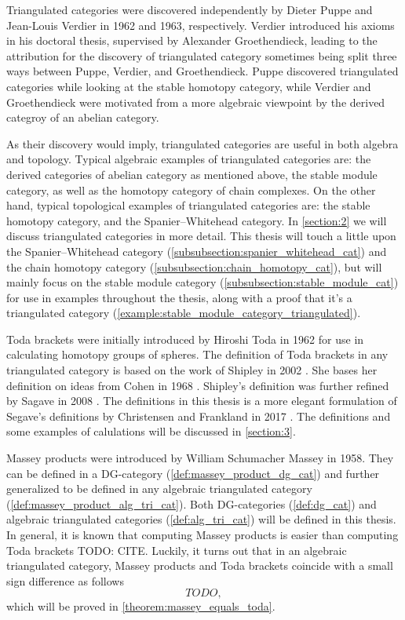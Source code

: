 Triangulated categories were discovered independently by Dieter Puppe and Jean-Louis Verdier in 1962 and 1963, respectively. Verdier introduced his axioms in his doctoral thesis, supervised by Alexander Groethendieck, leading to the attribution for the discovery of triangulated category sometimes being split three ways between Puppe, Verdier, and Groethendieck. Puppe discovered triangulated categories while looking at the stable homotopy category, while Verdier and Groethendieck were motivated from a more algebraic viewpoint by the derived categroy of an abelian category.

As their discovery would imply, triangulated categories are useful in both algebra and topology. Typical algebraic examples of triangulated categories are: the derived categories of abelian category as mentioned above, the stable module category, as well as the homotopy category of chain complexes. On the other hand, typical topological examples of triangulated categories are: the stable homotopy category, and the Spanier--Whitehead category. In \autoref{section:2} we will discuss triangulated categories in more detail. This thesis will touch a little upon the Spanier--Whitehead category (\autoref{subsubsection:spanier_whitehead_cat}) and the chain homotopy category (\autoref{subsubsection:chain_homotopy_cat}), but will mainly focus on the stable module category (\autoref{subsubsection:stable_module_cat}) for use in examples throughout the thesis, along with a proof that it's a triangulated category (\autoref{example:stable_module_category_triangulated}).

Toda brackets were initially introduced by Hiroshi Toda in 1962 for use in calculating homotopy groups of spheres. The definition of Toda brackets in any triangulated category is based on the work of Shipley in 2002 \cite[Definition A.2]{Shipley_2002}. She bases her definition on ideas from Cohen in 1968 \cite[Definition at the bottom of p. 308]{Cohen_1968}. Shipley's definition was further refined by Sagave in 2008 \cite[Remark 4.5]{Sagave_2008}. The definitions in this thesis is a more elegant formulation of Segave's definitions by Christensen and Frankland in 2017 \cite[Definition 3.1]{Christensen-Frankland_2017}. The definitions and some examples of calulations will be discussed in \autoref{section:3}.

Massey products were introduced by William Schumacher Massey in 1958. They can be defined in a DG-category (\autoref{def:massey_product_dg_cat}) and further generalized to be defined in any algebraic triangulated category (\autoref{def:massey_product_alg_tri_cat}). Both DG-categories (\autoref{def:dg_cat}) and algebraic triangulated categories (\autoref{def:alg_tri_cat}) will be defined in this thesis. In general, it is known that computing Massey products is easier than computing Toda brackets TODO: CITE. Luckily, it turns out that in an algebraic triangulated category, Massey products and Toda brackets coincide with a small sign difference as follows
\[
    TODO,
\]
which will be proved in \autoref{theorem:massey_equals_toda}.

